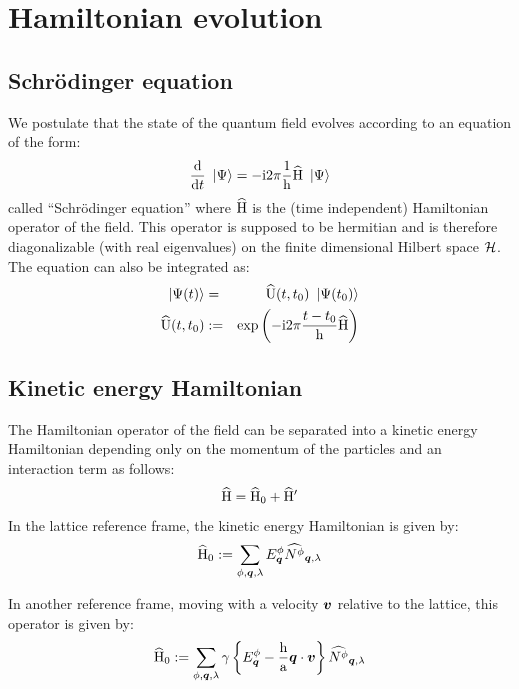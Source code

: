 \documentclass[10pt,a4paper,twoside,openany]{book}
\begin{document}
\chapter{Hamiltonian evolution}
\label{Hamiltonian evolution}

\section{Schrödinger equation}
\label{Schrödinger equation}

We postulate that the state of the quantum field evolves according to an equation of the form:
\begin{equation*}
\frac{\mathrm d}{\mathrm dt} \ \left|{\Psi}\right\rangle = -\mathrm{i} 2 \pi \frac 1 {\mathrm h} \widehat{\mathrm H} \ \left|{\Psi}\right\rangle
\end{equation*}
called ``Schrödinger equation'' where $\widehat{\mathrm H}$ is the (time independent) Hamiltonian operator of the field. This operator is supposed to be hermitian and is therefore diagonalizable (with real eigenvalues) on the finite dimensional Hilbert space $\mathcal H$. The equation can also be integrated as:
\begin{eqnarray*}
\ \left|{\Psi(t)}\right\rangle & = & \widehat{\mathrm U}({t},{t_0}) \ \left|{\Psi(t_0)}\right\rangle \\
\widehat{\mathrm U}({t},{t_0}) & := & \mathrm{exp} \left( {- \mathrm{i} 2 \pi \frac{t - t_0} {\mathrm h} \widehat{\mathrm H}} \right)
\end{eqnarray*}

\section{Kinetic energy Hamiltonian}
\label{Kinetic energy Hamiltonian}

The Hamiltonian operator of the field can be separated into a kinetic energy Hamiltonian depending only on the momentum of the particles and an interaction term as follows:
\begin{equation*}
\widehat{\mathrm H} = \widehat{\mathrm H}_0 + \widehat{\mathrm H}'
\end{equation*}
In the lattice reference frame, the kinetic energy Hamiltonian is given by:
\begin{equation*}
\widehat{\mathrm H}_0 := \sum_{\phi,\boldsymbol{q},\lambda} E^{\phi}_{\boldsymbol{q}} \widehat{N^{\phi}}_{{\boldsymbol{q}}, {\lambda}}
\end{equation*}

In another reference frame, moving with a velocity $\boldsymbol{v}$ relative to the lattice, this operator is given by:
\begin{equation*}
\widehat{\mathrm H}_0 := \sum_{\phi,\boldsymbol{q},\lambda} \gamma \left\{ E^{\phi}_{\boldsymbol{q}} - \frac {\mathrm h} {\mathrm a} \boldsymbol{q} \cdot \boldsymbol{v} \right\} \widehat{N^{\phi}}_{{\boldsymbol{q}}, {\lambda}}
\end{equation*}
\end{document}
